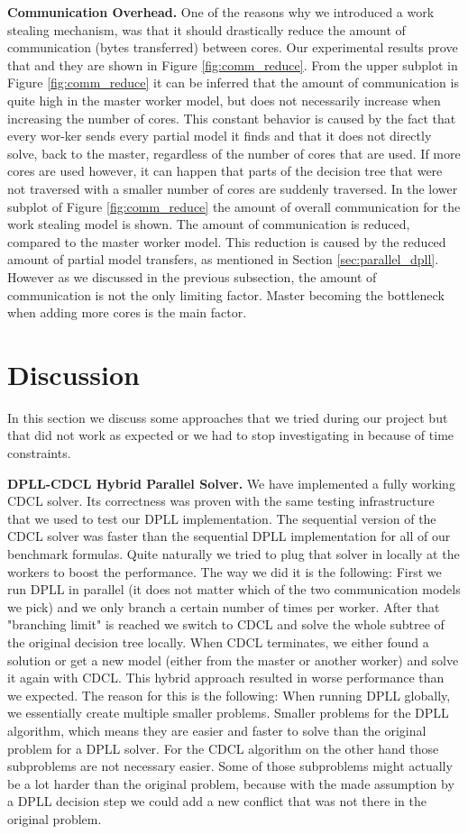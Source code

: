 \documentclass[letterpaper]{article}
\newcommand{\mypar}[1]{{\bf #1.}}
\begin{document}
\mypar{Communication Overhead}
One of the reasons why we introduced a work stealing mechanism,
was that it should drastically reduce the amount of communication (bytes transferred) between cores.
Our experimental results prove that and they are shown in Figure \ref{fig:comm_reduce}.
From the upper subplot in Figure \ref{fig:comm_reduce} it can be inferred that the amount of communication is quite high in the master worker model,
but does not necessarily increase when increasing the number of cores.
This constant behavior is caused by the fact that every wor-ker sends every partial model it finds and that it does not directly solve, back to the master,
regardless of the number of cores that are used.
If more cores are used however, it can happen that parts of the decision tree that were not traversed with a smaller number of cores are suddenly traversed.
In the lower subplot of Figure \ref{fig:comm_reduce} the amount of overall communication for the work stealing model is shown.
The amount of communication is reduced, compared to the master worker model.
This reduction is caused by the reduced amount of partial model transfers, as mentioned in Section \ref{sec:parallel_dpll}.
However as we discussed in the previous subsection, the amount of communication is not the only limiting factor.
Master becoming the bottleneck when adding more cores is the main factor.

\section{Discussion}\label{sec:discussion}
In this section we discuss some approaches that we tried during our project but that did not work as expected or we had to stop investigating in because of time constraints.

\mypar{DPLL-CDCL Hybrid Parallel Solver}
We have implemented a fully working CDCL solver.
Its correctness was proven with the same testing infrastructure that we used to test our DPLL implementation.
The sequential version of the CDCL solver was faster than the sequential DPLL implementation for all of our benchmark formulas.
Quite naturally we tried to plug that solver in locally at the workers to boost the performance.
The way we did it is the following:
First we run DPLL in parallel (it does not matter which of the two communication models we pick) and we only branch a certain number of times per worker.
After that "branching limit" is reached we switch to CDCL and solve the whole subtree of the original decision tree locally.
When CDCL terminates, we either found a solution or get a new model (either from the master or another worker) and solve it again with CDCL.
This hybrid approach resulted in worse performance than we expected.
The reason for this is the following:
When running DPLL globally, we essentially create multiple smaller problems.
Smaller problems for the DPLL algorithm, which means they are easier and faster to solve than the original problem for a DPLL solver.
For the CDCL algorithm on the other hand those subproblems are not necessary easier.
Some of those subproblems might actually be a lot harder than the original problem,
because with the made assumption by a DPLL decision step we could add a new conflict that was not there in the original problem.
\end{document}
